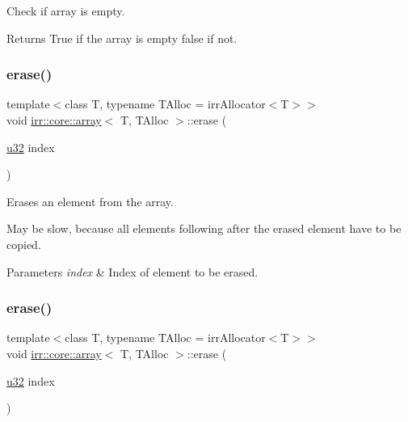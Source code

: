 Check if array is empty. 

\begin{DoxyReturn}{Returns}
True if the array is empty false if not. 
\end{DoxyReturn}
\mbox{\label{classirr_1_1core_1_1array_a5ba14e37dddaecd9c3e813a78c157dc8}} 
\subsubsection{\texorpdfstring{erase()}{erase()}\hspace{0.1cm}{\footnotesize\ttfamily [1/4]}}
{\footnotesize\ttfamily template$<$class T, typename T\+Alloc = irr\+Allocator$<$\+T$>$$>$ \\
void \hyperlink{classirr_1_1core_1_1array}{irr\+::core\+::array}$<$ T, T\+Alloc $>$\+::erase (\begin{DoxyParamCaption}\item[{\hyperlink{namespaceirr_a0416a53257075833e7002efd0a18e804}{u32}}]{index }\end{DoxyParamCaption})\hspace{0.3cm}{\ttfamily [inline]}}



Erases an element from the array. 

May be slow, because all elements following after the erased element have to be copied. 
\begin{DoxyParams}{Parameters}
{\em index} & Index of element to be erased. \\
\hline
\end{DoxyParams}
\mbox{\label{classirr_1_1core_1_1array_a5ba14e37dddaecd9c3e813a78c157dc8}} 
\subsubsection{\texorpdfstring{erase()}{erase()}\hspace{0.1cm}{\footnotesize\ttfamily [2/4]}}
{\footnotesize\ttfamily template$<$class T, typename T\+Alloc = irr\+Allocator$<$\+T$>$$>$ \\
void \hyperlink{classirr_1_1core_1_1array}{irr\+::core\+::array}$<$ T, T\+Alloc $>$\+::erase (\begin{DoxyParamCaption}\item[{\hyperlink{namespaceirr_a0416a53257075833e7002efd0a18e804}{u32}}]{index }\end{DoxyParamCaption})\hspace{0.3cm}{\ttfamily [inline]}}



